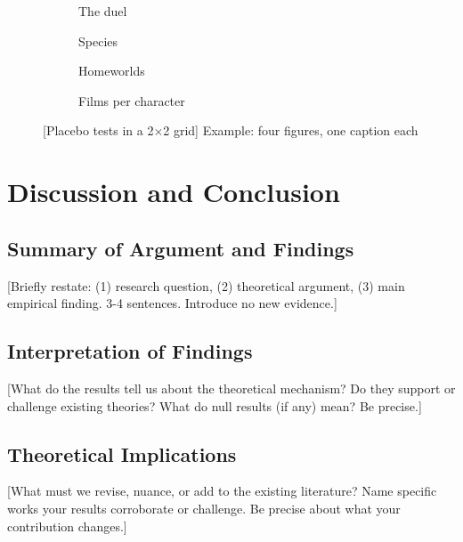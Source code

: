 \begin{figure}[htbp]
    \centering
    \begin{subfigure}{0.48\textwidth}   %
        \caption{The duel}
    \end{subfigure}\hfill               %
    \begin{subfigure}{0.48\textwidth}
        \caption{Species}
    \end{subfigure}

    \medskip                            %

    \begin{subfigure}{0.48\textwidth}
        \caption{Homeworlds}
    \end{subfigure}\hfill
    \begin{subfigure}{0.48\textwidth}
        \caption{Films per character}
    \end{subfigure}
    \caption{[Placebo tests in a 2$\times$2 grid] Example: four figures, one caption each}
    \label{fig:grid}
\end{figure}

\section{Discussion and Conclusion}\label{sec:discussion} %

\subsection{Summary of Argument and Findings} %
[Briefly restate: (1) research question, (2) theoretical argument, (3) main empirical finding. 3-4 sentences. Introduce no new evidence.]

\subsection{Interpretation of Findings} %
[What do the results tell us about the theoretical mechanism? Do they support or challenge existing theories? What do null results (if any) mean? Be precise.]

\subsection{Theoretical Implications} %
[What must we revise, nuance, or add to the existing literature? Name specific works your results corroborate or challenge. Be precise about what your contribution changes.]

